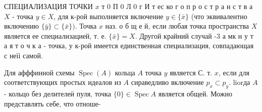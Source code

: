 \documentclass[10pt]{article}
\begin{document}
СПЕЦИАЛИЗАЦИЯ ТОЧКИ $x$ т 0 П 0 Л 0 г И т ес ко г о п р о с т р а н с т в а $X$ - точка $y \in X$, для к-рой выполняется включение $y \in\{\bar{x}\}$ (что эквивалентно включению $\{\bar{y}\} \subset\{\bar{x}\})$. Точка $x$ наз. о б щ е й, если любая точка пространства $X$ является ее специализацией, т. е. $\{\bar{x}\}=X$. Другой крайний случай -3 а мк н у т а я т о ч к а - точка, у к-рой имеется единственная специализация, совпадающая с неїі самой.



Для афффинной схемы $\operatorname{Spec}(A)$ кольца $A$ точка $y$ является С. т. $x$, если для соответствующих простых идеалов из $A$ сираведливо включение $p_{x} \subset p_{y}$. liorда $A$ - кольцо без делителеӥ пуля, точка $\{0\} \in \operatorname{Spec} A$ является общей. Можно представлять себе, что отноше-
\end{document}
